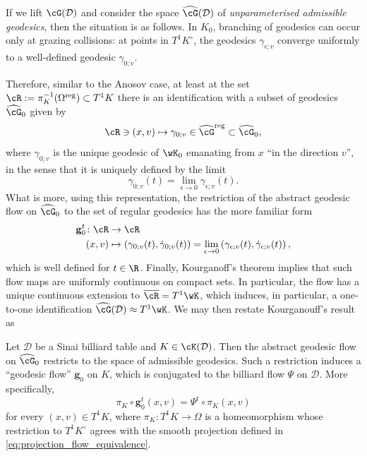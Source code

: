 \documentclass[reqno,11pt]{amsart}
\begin{document}
    If we lift \(\cG(\mathcal{D})\) and consider the space \(\widehat{\cG}(\mathcal{D})\) of \emph{unparameterised admissible geodesics}, then the situation is as follows.
    In \(K_0\), branching of geodesics can occur only at grazing collisions: at points in \(T^1K^\circ\), the geodesics \(\gamma_{\epsilon;v}\) converge uniformly to a well-defined geodesic \(\gamma_{0;v}\). 
    \par Therefore, similar to the Anosov case, at least at the set \(\cR := \pi_K^{-1}(\Omega^\mathrm{reg}) \subset T^1K\) there is an identification with a subset of geodesics \(\widehat{\cG}_0\) given by
    \[
        \cR \ni (x,v) \mapsto \gamma_{0;v} \in \widehat{\cG}^{\mathrm{reg}} \subset \widehat{\cG}_0,
    \]
    where \(\gamma_{0;v}\) is the unique geodesic of \(\wK_0\) emanating from \(x\) ``in the direction \(v\)'', in the sense that it is uniquely defined by the limit
    \[
        \gamma_{0;v}(t) = \lim_{\epsilon \to 0}\gamma_{\epsilon;v}(t).
    \]
    What is more, using this representation, the restriction of the abstract geodesic flow on \(\widehat{\cG}_0\) to the set of regular geodesics has the more familiar form
    \begin{equation}\label{eq:geodesic_flow_K_0}
    \begin{split}
        \mathbf{g}_0^t\colon \cR &\to \cR \\
        (x,v) &\mapsto (\gamma_{0;v}(t), \dot\gamma_{0;v}(t)) =  \lim_{\epsilon \to 0}\left(\gamma_{\epsilon;v}(t), \dot\gamma_{\epsilon;v}(t)\right),    
    \end{split}
    \end{equation}
    which is well defined for \( t\in \R \).
    Finally, Kourganoff's theorem \cite{kourganoff_anosov_2016} implies that such flow maps are uniformly continuous on compact sets.
    In particular, the flow has a unique continuous extension to \(\overline{\cR} = T^1\wK\), which induces, in particular, a one-to-one identification \(\widehat{\cG}(\mathcal{D}) \approx T^1\wK\).
    We may then restate Kourganouff's result as 
    \begin{theorem}[Kourganoff]\label{thm:kourganoff_on_steroids}
        Let \( \mathcal{D} \) be a Sinai billiard table and \( K \in \cK(\mathcal{D}) \). 
        Then the abstract geodesic flow on \(\widehat{\cG}_0\) restricts to the space of admissible geodesics.
        Such a restriction induces a ``geodesic flow'' \( \mathbf{g}_0 \) on \( K \), which is conjugated to the billiard flow \( \Psi \) on \( \mathcal{D} \).
        More specifically,
        \[
            \pi_K \circ \mathbf{g}^t_0(x,v) = \Psi^t\circ\pi_K(x,v)
        \]
        for every \((x,v) \in T^1K\), where \(\pi_K\colon T^1K \to \Omega\) is a homeomorphism whose restriction to \(T^1K^\circ\) agrees with the smooth projection defined in \eqref{eq:projection_flow_equivalence}.
     \end{theorem}
\end{document}
